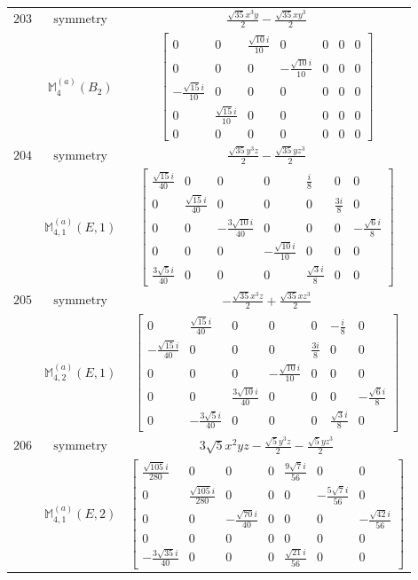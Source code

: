 \documentclass[fleqn,8pt,landscape]{jsarticle}
\begin{document}
\begin{longtable}{ccc}
$ 203 $ & $ \text{symmetry} $ & $ \frac{\sqrt{35} x^{3} y}{2} - \frac{\sqrt{35} x y^{3}}{2} $ \\
$  $ & $ \mathbb{M}_{4}^{(a)}(B_{2}) $ & $ \begin{bmatrix} 0 & 0 & \frac{\sqrt{10} i}{10} & 0 & 0 & 0 & 0 \\ 0 & 0 & 0 & - \frac{\sqrt{10} i}{10} & 0 & 0 & 0 \\ - \frac{\sqrt{15} i}{10} & 0 & 0 & 0 & 0 & 0 & 0 \\ 0 & \frac{\sqrt{15} i}{10} & 0 & 0 & 0 & 0 & 0 \\ 0 & 0 & 0 & 0 & 0 & 0 & 0 \end{bmatrix} $ \\ \hline
$ 204 $ & $ \text{symmetry} $ & $ \frac{\sqrt{35} y^{3} z}{2} - \frac{\sqrt{35} y z^{3}}{2} $ \\
$  $ & $ \mathbb{M}_{4,1}^{(a)}(E,1) $ & $ \begin{bmatrix} \frac{\sqrt{15} i}{40} & 0 & 0 & 0 & \frac{i}{8} & 0 & 0 \\ 0 & \frac{\sqrt{15} i}{40} & 0 & 0 & 0 & \frac{3 i}{8} & 0 \\ 0 & 0 & - \frac{3 \sqrt{10} i}{40} & 0 & 0 & 0 & - \frac{\sqrt{6} i}{8} \\ 0 & 0 & 0 & - \frac{\sqrt{10} i}{10} & 0 & 0 & 0 \\ \frac{3 \sqrt{5} i}{40} & 0 & 0 & 0 & \frac{\sqrt{3} i}{8} & 0 & 0 \end{bmatrix} $ \\ \hline
$ 205 $ & $ \text{symmetry} $ & $ - \frac{\sqrt{35} x^{3} z}{2} + \frac{\sqrt{35} x z^{3}}{2} $ \\
$  $ & $ \mathbb{M}_{4,2}^{(a)}(E,1) $ & $ \begin{bmatrix} 0 & \frac{\sqrt{15} i}{40} & 0 & 0 & 0 & - \frac{i}{8} & 0 \\ - \frac{\sqrt{15} i}{40} & 0 & 0 & 0 & \frac{3 i}{8} & 0 & 0 \\ 0 & 0 & 0 & - \frac{\sqrt{10} i}{10} & 0 & 0 & 0 \\ 0 & 0 & \frac{3 \sqrt{10} i}{40} & 0 & 0 & 0 & - \frac{\sqrt{6} i}{8} \\ 0 & - \frac{3 \sqrt{5} i}{40} & 0 & 0 & 0 & \frac{\sqrt{3} i}{8} & 0 \end{bmatrix} $ \\ \hline
$ 206 $ & $ \text{symmetry} $ & $ 3 \sqrt{5} x^{2} y z - \frac{\sqrt{5} y^{3} z}{2} - \frac{\sqrt{5} y z^{3}}{2} $ \\
$  $ & $ \mathbb{M}_{4,1}^{(a)}(E,2) $ & $ \begin{bmatrix} \frac{\sqrt{105} i}{280} & 0 & 0 & 0 & \frac{9 \sqrt{7} i}{56} & 0 & 0 \\ 0 & \frac{\sqrt{105} i}{280} & 0 & 0 & 0 & - \frac{5 \sqrt{7} i}{56} & 0 \\ 0 & 0 & - \frac{\sqrt{70} i}{40} & 0 & 0 & 0 & - \frac{\sqrt{42} i}{56} \\ 0 & 0 & 0 & 0 & 0 & 0 & 0 \\ - \frac{3 \sqrt{35} i}{40} & 0 & 0 & 0 & \frac{\sqrt{21} i}{56} & 0 & 0 \end{bmatrix} $ \\ \hline

\end{longtable}
\end{document}
